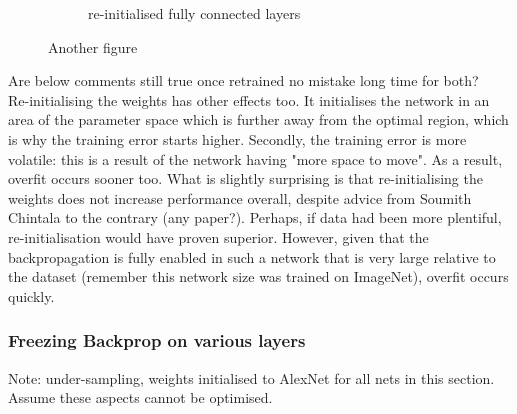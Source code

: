 \documentclass[a4paper,11pt]{article}
\begin{document}
\begin{figure}
\begin{minipage}[b]{\textwidth}
\begin{subfigure}{.5\textwidth}
        \caption{re-initialised fully connected layers}\label{fig:2b}
      \end{subfigure} \par \vspace*{20pt} %
      \caption{Another figure}\label{fig:2}
    \end{minipage}%
\end{figure}

Are below comments still true once retrained no mistake long time for both? \\

Re-initialising the weights has other effects too. It initialises the network in an area of the parameter space which is further away from the optimal region, which is why the training error starts higher. Secondly, the training error is more volatile: this is a result of the network having "more space to move". As a result, overfit occurs sooner too. What is slightly surprising is that re-initialising the weights does not increase performance overall, despite advice from Soumith Chintala to the contrary (any paper?). Perhaps, if data had been more plentiful, re-initialisation would have proven superior. However, given that the backpropagation is fully enabled in such a network that is very large relative to the dataset (remember this network size was trained on ImageNet), overfit occurs quickly. \\


\subsubsection{Freezing Backprop on various layers}

Note: under-sampling, weights initialised to AlexNet for all nets in this section. Assume these aspects cannot be optimised. \\
\end{document}
